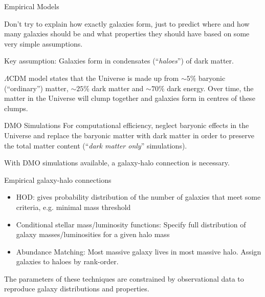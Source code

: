 \begin{frame}{Empirical Models}
    
    Don't try to explain how exactly galaxies form, just to predict where and how many galaxies should be and what properties they should have based on some very simple assumptions.
    
    Key assumption: Galaxies form in condensates (``\emph{haloes}'') of dark matter.
    
    $\Lambda$CDM model states that the Universe is made up from $\sim 5\%$ baryonic (``ordinary'') matter, $\sim 25\%$ dark matter and $\sim 70 \%$ dark energy.
    Over time, the matter in the Universe will clump together and galaxies form in centres of these clumps.
    
\end{frame}


\begin{frame}{DMO Simulations}
    For computational efficiency, neglect baryonic effects in the Universe and replace the baryonic matter with dark matter in order to preserve the total matter content (``\emph{dark matter only}'' simulations).
    
    
    With DMO simulations available, a galaxy-halo connection is necessary.
\end{frame}


\begin{frame}{Empirical galaxy-halo connections}
    \begin{itemize}
        \item HOD: gives probability distribution of the number of galaxies that meet some criteria, e.g. minimal mass threshold
        \item Conditional stellar mass/luminosity functions: Specify full distribution of galaxy masses/luminosities for a given halo mass
        \item Abundance Matching: Most massive galaxy lives in most massive halo. Assign galaxies to haloes by rank-order.
    \end{itemize}
    
    The parameters of these techniques are constrained by observational data to reproduce galaxy distributions and properties.
    
\end{frame}


